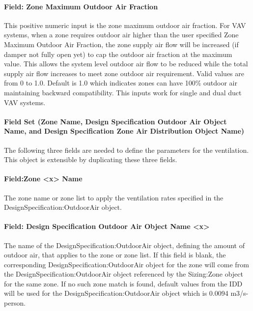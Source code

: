 \paragraph{Field: Zone Maximum Outdoor Air Fraction}\label{field-zone-maximum-outdoor-air-fraction}

This positive numeric input is the zone maximum outdoor air fraction. For VAV systems, when a zone requires outdoor air higher than the user specified Zone Maximum Outdoor Air Fraction, the zone supply air flow will be increased (if damper not fully open yet) to cap the outdoor air fraction at the maximum value. This allows the system level outdoor air flow to be reduced while the total supply air flow increases to meet zone outdoor air requirement. Valid values are from 0 to 1.0. Default is 1.0 which indicates zones can have 100\% outdoor air maintaining backward compatibility. This inputs work for single and dual duct VAV systems.

\paragraph{Field Set (Zone Name, Design Specification Outdoor Air Object Name, and Design Specification Zone Air Distribution Object Name)}\label{field-set-zone-name-design-specification-outdoor-air-object-name-and-design-specification-zone-air-distribution-object-name}

The following three fields are needed to define the parameters for the ventilation. This object is extensible by duplicating these three fields.

\paragraph{Field:Zone \textless{}x\textgreater{} Name}\label{fieldzone-x-name}

The zone name or zone list to apply the ventilation rates specified in the DesignSpecification:OutdoorAir object.

\paragraph{Field: Design Specification Outdoor Air Object Name \textless{}x\textgreater{}}\label{field-design-specification-outdoor-air-object-name-x}

The name of the DesignSpecification:OutdoorAir object, defining the amount of outdoor air, that applies to the zone or zone list. If this field is blank, the corresponding DesignSpecification:OutdoorAir object for the zone will come from the DesignSpecification:OutdoorAir object referenced by the Sizing:Zone object for the same zone. If no such zone match is found, default values from the IDD will be used for the DesignSpecification:OutdoorAir object which is 0.0094 m3/s-person.

